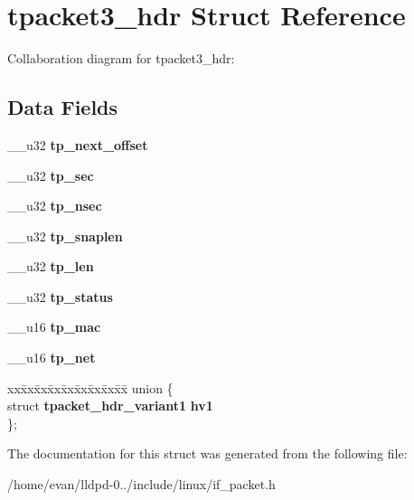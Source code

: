 \section{tpacket3\-\_\-hdr \-Struct \-Reference}
\label{structtpacket3__hdr}


\-Collaboration diagram for tpacket3\-\_\-hdr\-:
\subsection*{\-Data \-Fields}
\begin{DoxyCompactItemize}
\item 
\-\_\-\-\_\-u32 {\bfseries tp\-\_\-next\-\_\-offset}\label{structtpacket3__hdr_a65e012ce20e4ea02c6a5d2e581074310}

\item 
\-\_\-\-\_\-u32 {\bfseries tp\-\_\-sec}\label{structtpacket3__hdr_af7623d35c4e62d3adbcf538f2c020a61}

\item 
\-\_\-\-\_\-u32 {\bfseries tp\-\_\-nsec}\label{structtpacket3__hdr_af87f67531139327aafe58a3415817598}

\item 
\-\_\-\-\_\-u32 {\bfseries tp\-\_\-snaplen}\label{structtpacket3__hdr_a2a88b8ff6c0f5e97090acc008a23b9bf}

\item 
\-\_\-\-\_\-u32 {\bfseries tp\-\_\-len}\label{structtpacket3__hdr_abe67df7c04524b60f45a1ab757aec052}

\item 
\-\_\-\-\_\-u32 {\bfseries tp\-\_\-status}\label{structtpacket3__hdr_af9d75e812fa4ac7875f4523632e504f7}

\item 
\-\_\-\-\_\-u16 {\bfseries tp\-\_\-mac}\label{structtpacket3__hdr_ae643e0917fc35773d760e2cd5a1bea22}

\item 
\-\_\-\-\_\-u16 {\bfseries tp\-\_\-net}\label{structtpacket3__hdr_a049ffb61207439057a2fcd60f11c47cb}

\item 
\begin{tabbing}
xx\=xx\=xx\=xx\=xx\=xx\=xx\=xx\=xx\=\kill
union \{\\
\>struct {\bf tpacket\_hdr\_variant1} {\bfseries hv1}\\
\}; \label{structtpacket3__hdr_a3f6afbc8bb1fd9536386ef3d705cfaa9}
\\

\end{tabbing}\end{DoxyCompactItemize}


\-The documentation for this struct was generated from the following file\-:\begin{DoxyCompactItemize}
\item 
/home/evan/lldpd-\/0../include/linux/if\-\_\-packet.\-h\end{DoxyCompactItemize}
